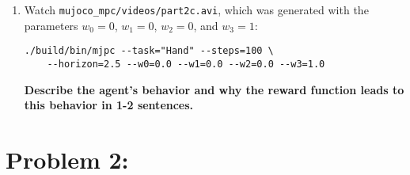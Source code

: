 \documentclass[12pt]{article}
\begin{document}
\begin{enumerate}
\begin{enumerate}[itemsep=20pt]
    \item Watch \texttt{mujoco\_mpc/videos/part2c.avi}, which was generated with the parameters $w_0 = 0$, $w_1 = 0$, $w_2 = 0$, and $w_3 = 1$:
\begin{tcolorbox}[width=\linewidth, sharp corners=all, colback=white!95!black]
\begin{verbatim}
./build/bin/mjpc --task="Hand" --steps=100 \
    --horizon=2.5 --w0=0.0 --w1=0.0 --w2=0.0 --w3=1.0
\end{verbatim}
\end{tcolorbox}
    \textbf{\color{red}Describe the agent's behavior and why the reward function leads to this behavior in 1-2 sentences.}
    
\end{enumerate}

\end{enumerate}

\newpage

\section*{Problem 2: }
\end{document}
